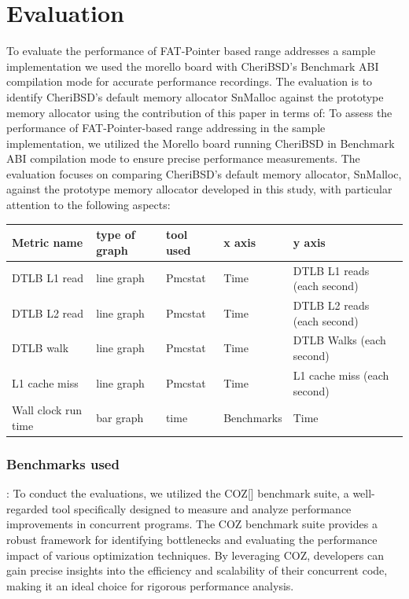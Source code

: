 \chapter{Evaluation}
\ifpdf
    \graphicspath{{Evaluation/Figs/Raster/}{Evaluation/Figs/PDF/}{Evaluation/Figs/}}
\else
    \graphicspath{{Evaluation/Figs/Vector/}{Evaluation/Figs/}}
\fi

To evaluate the performance of FAT-Pointer based range addresses a sample implementation we used
the morello board with CheriBSD's Benchmark ABI\cite{noauthor_benchmark_nodate} compilation mode for accurate performance recordings. 
The evaluation is to identify CheriBSD's default memory allocator SnMalloc against the prototype memory 
allocator using the contribution of this paper in terms of: 
To assess the performance of FAT-Pointer-based range addressing in the sample implementation, we utilized the 
Morello board running CheriBSD in Benchmark ABI compilation mode to ensure precise performance measurements. 
The evaluation focuses on comparing CheriBSD's default memory allocator, SnMalloc, against the prototype 
memory allocator developed in this study, with particular attention to the following aspects:

\begin{table}[!ht]
  \centering
  \begin{tabular}{|l|l|l|l|l|}
  \hline
      Metric name & type of graph & tool used & x axis & y axis \\ \hline
      DTLB L1 read & line graph & Pmcstat & Time & DTLB L1 reads (each second) \\ \hline
      DTLB L2 read & line graph & Pmcstat & Time & DTLB L2 reads (each second) \\ \hline
      DTLB walk & line graph & Pmcstat & Time & DTLB Walks (each second) \\ \hline
      L1 cache miss & line graph & Pmcstat & Time & L1 cache miss (each second) \\ \hline
      Wall clock run time & bar graph & time & Benchmarks & Time \\ \hline
  \end{tabular}
\end{table}

\subsection{Benchmarks used}:
To conduct the evaluations, we utilized the COZ[] benchmark suite, a well-regarded tool specifically designed 
to measure and analyze performance improvements in concurrent programs. The COZ benchmark suite provides a
robust framework for identifying bottlenecks and evaluating the performance impact of various optimization
techniques. By leveraging COZ, developers can gain precise insights into the efficiency and scalability of
their concurrent code, making it an ideal choice for rigorous performance analysis.


